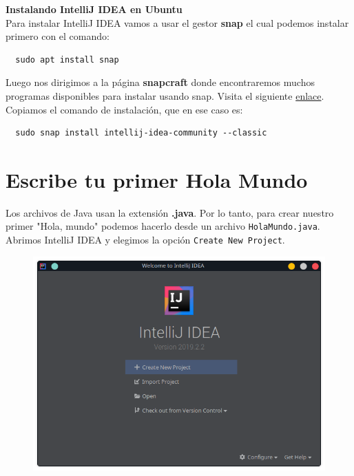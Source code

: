 \documentclass{article}
\begin{document}
\textbf{Instalando IntelliJ IDEA en Ubuntu}\\

Para instalar IntelliJ IDEA vamos a usar el gestor \textbf{snap} el cual
podemos instalar primero con el comando:\\

\begin{verbatim}
  sudo apt install snap
\end{verbatim}

Luego nos dirigimos a la página \textbf{snapcraft} donde encontraremos muchos
programas disponibles para instalar usando snap. Visita el siguiente
\href{https://snapcraft.io/intellij-idea-community}{enlace}.\\

Copiamos el comando de instalación, que en ese caso es:

\begin{verbatim}
  sudo snap install intellij-idea-community --classic
\end{verbatim}


\section{Escribe tu primer Hola Mundo}%
Los archivos de Java usan la extensión \textbf{.java}. Por lo tanto, para crear
nuestro primer "Hola, mundo" podemos hacerlo desde un archivo
\texttt{HolaMundo.java}.\\

Abrimos IntelliJ IDEA y elegimos la opción  \texttt{Create New Project}.\\

\begin{figure}[h!]
  \centering
  \includegraphics[scale=0.74]{./Pictures/032_crear_proyecto_ij.png}
\end{figure}
\end{document}
